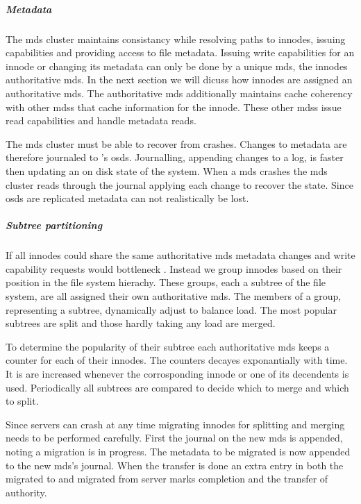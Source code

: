 \subparagraph{Metadata}
The \ac{mds} cluster maintains consistancy while resolving paths to innodes, issuing capabilities and providing access to file metadata. Issuing write capabilities for an innode or changing its metadata can only be done  by a unique \ac{mds}, the innodes authoritative \ac{mds}. In the next section we will dicuss how innodes are assigned an authoritative \ac{mds}. The authoritative \ac{mds} additionally maintains cache coherency with other \acp{mds} that cache information for the innode. These other \acp{mds} issue read capabilities and handle metadata reads.

The \ac{mds} cluster must be able to recover from crashes. Changes to metadata are therefore journaled to \ceph{}'s \acfp{osd}. Journalling, appending changes to a log, is faster then updating an on disk state of the system. When a \ac{mds} crashes the \ac{mds} cluster reads through the journal applying each change to recover the state. Since \acp{osd} are replicated metadata can not realistically be lost.

\subparagraph{Subtree partitioning}
If all innodes could share the same authoritative \ac{mds} metadata changes and write capability requests would bottleneck \ceph{}. Instead we group innodes based on their position in the file system hierachy. These groups, each a subtree of the file system, are all assigned their own authoritative \ac{mds}. The members of a group, representing a subtree, dynamically adjust to balance load. The most popular subtrees are split and those hardly taking any load are merged.

To determine the popularity of their subtree each authoritative \ac{mds} keeps a counter for each of their innodes. The counters decayes exponantially with time. It is are increased whenever the corrosponding innode or one of its decendents is used. Periodically all subtrees are compared to decide which to merge and which to split.

Since servers can crash at any time migrating innodes for splitting and merging needs to be performed carefully. First the journal on the new \ac{mds} is appended, noting a migration is in progress. The metadata to be migrated is now appended to the new \ac{mds}'s journal. When the transfer is done an extra entry in both the migrated to and migrated from server marks completion and the transfer of authority. 
